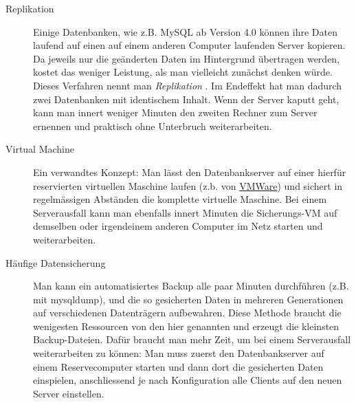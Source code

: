 \begin{description}
\item[ Replikation ] Einige Datenbanken, wie z.B. MySQL ab Version 4.0 können ihre Daten laufend auf einen auf einem anderen Computer laufenden Server kopieren. Da jeweils nur die geänderten Daten im Hintergrund übertragen werden, kostet das weniger Leistung, als man vielleicht zunächst denken würde. Dieses Verfahren nennt man \textit{Replikation} . Im Endeffekt hat man dadurch zwei Datenbanken mit identischem Inhalt. Wenn der Server kaputt geht, kann man innert weniger Minuten den zweiten Rechner zum Server ernennen und praktisch ohne Unterbruch weiterarbeiten.
\item [Virtual Machine] Ein verwandtes Konzept: Man lässt den Datenbankserver auf einer hierfür reservierten virtuellen Maschine laufen (z.b. von \href{http://www.vmware.com/}{VMWare}) und sichert in regelmässigen Abständen die komplette virtuelle Maschine. Bei einem Serverausfall kann man ebenfalls innert Minuten die Sicherungs-VM auf demselben oder irgendeinem anderen Computer im Netz starten und weiterarbeiten.
\item [Häufige Datensicherung] Man kann ein automatisiertes Backup alle paar Minuten durchführen (z.B. mit mysqldump), und die so gesicherten Daten in mehreren Generationen auf verschiedenen Datenträgern aufbewahren. Diese Methode braucht die wenigesten Ressourcen von den hier genannten und erzeugt die kleinsten Backup-Dateien. Dafür braucht man mehr Zeit, um bei einem Serverausfall weiterarbeiten zu können: Man muss zuerst den Datenbankserver auf einem Reservecomputer starten und dann dort die gesicherten Daten einspielen, anschliessend je nach Konfiguration alle Clients auf den neuen Server einstellen.
\end{description}





